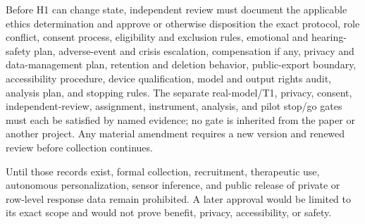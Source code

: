 Before H1 can change state, independent review must document the applicable
ethics determination and approve or otherwise disposition the exact protocol,
role conflict, consent process, eligibility and exclusion rules, emotional and
hearing-safety plan, adverse-event and crisis escalation, compensation if any,
privacy and data-management plan, retention and deletion behavior, public-export
boundary, accessibility procedure, device qualification, model and output
rights audit, analysis plan, and stopping rules. The separate real-model/T1,
privacy, consent, independent-review, assignment, instrument, analysis, and
pilot stop/go gates must each be satisfied by named evidence; no gate is
inherited from the paper or another project. Any material amendment requires a
new version and renewed review before collection continues.

Until those records exist, formal collection, recruitment, therapeutic use,
autonomous personalization, sensor inference, and public release of private or
row-level response data remain prohibited. A later approval would be limited to
its exact scope and would not prove benefit, privacy, accessibility, or safety.
